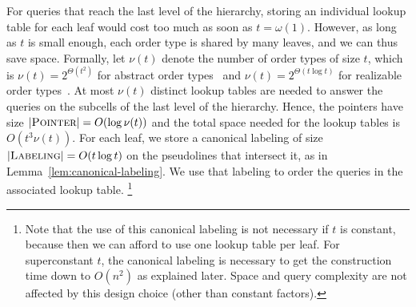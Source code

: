 For queries that reach the last level of the hierarchy, storing an individual
lookup table for each leaf would cost too much as soon as \(t = \omega(1)\).
However, as long as \(t\) is small enough, each order type is shared by
many leaves, and we can thus save space. Formally, let \(\nu(t)\) denote the
number of order types of size \(t\), which is \(\nu(t) = 2^{\Theta(t^2)}\) for
abstract order types~\cite{Fe96} and \(\nu(t) = 2^{\Theta(t \log{t})}\) for realizable
order types~\cite{Al86,GP86}. At most \(\nu(t)\) distinct lookup tables are needed
to answer
the queries on the subcells of the last level of the hierarchy. Hence, the
pointers have size \(|\textsc{Pointer}| = O(\log \nu(t))\) and the total space needed for the lookup
tables is \(O(t^3 \nu(t))\). For each leaf, we store a canonical
labeling of size \(|\textsc{Labeling}| = O(t \log t)\) on the pseudolines that intersect it,
as in Lemma~\ref{lem:canonical-labeling}. We use
that labeling to order the queries in the associated lookup table.%
\ifjournal\footnote{%
Note that the use of this canonical labeling is not necessary if
\(t\) is constant, because then we can afford to use one lookup table per leaf.
For superconstant \(t\), the canonical labeling is necessary to get
the construction time down to \(O(n^2)\) as explained later.
Space and query complexity are not affected by this design choice (other than
constant factors).%
}\fi
